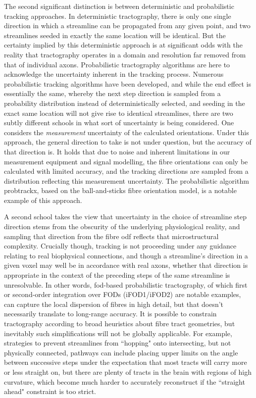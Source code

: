The second significant distinction is between deterministic and probabilistic tracking approaches.
In deterministic tractography, there is only one single direction in which a streamline can be propagated from any given point, and two streamlines seeded in exactly the same location will be identical.
But the certainty implied by this deterministic approach is at significant odds with the reality that tractography operates in a domain and resolution far removed from that of individual axons.
Probabilistic tractography algorithms are here to acknowledge the uncertainty inherent in the tracking process.
Numerous probabilistic tracking algorithms have been developed, and while the end effect is essentially the same, whereby the next step direction is sampled from a probability distribution instead of deterministically selected, and seeding in the exact same location will not give rise to identical streamlines, there are two subtly different schools in what sort of uncertainty is being considered\autocite{Jeurissen2019}.
One considers the \textit{measurement} uncertainty of the calculated orientations.
Under this approach, the general direction to take is not under question, but the accuracy of that direction is.
It holds that due to noise and inherent limitations in our measurement equipment and signal modelling, the fibre orientations can only be calculated with limited accuracy, and the tracking directions are sampled from a distribution reflecting this measurement uncertainty.
The probabilistic algorithm probtrackx\autocite{Behrens2007}, based on the ball-and-sticks fibre orientation model\autocite{Behrens2003}, is a notable example of this approach.

A second school takes the view that uncertainty in the choice of streamline step direction stems from the obscurity of the underlying physiological reality, and sampling that direction from the fibre \gls{odf} reflects that microstructural complexity.
Crucially though, tracking is not proceeding under any guidance relating to real biophysical connections, and though a streamline's direction in a given voxel may well be in accordance with real axons, whether that direction is appropriate in the context of the preceding steps of the same streamline is unresolvable.
In other words, \gls{fod}-based probabilistic tractography, of which first or second-order integration over FODs (iFOD1/iFOD2)\autocite{Tournier2012,Tournier2010} are notable examples, can capture the local dispersion of fibres in high detail, but that doesn't necessarily translate to long-range accuracy.
It is possible to constrain tractography according to broad heuristics about fibre tract geometries, but inevitably such simplifications will not be globally applicable.
For example, strategies to prevent streamlines from ``hopping" onto intersecting, but not physically connected, pathways can include placing upper limits on the angle between successive steps under the expectation that most tracts will carry more or less straight on, but there are plenty of tracts in the brain with regions of high curvature, which become much harder to accurately reconstruct if the ``straight ahead" constraint is too strict.

